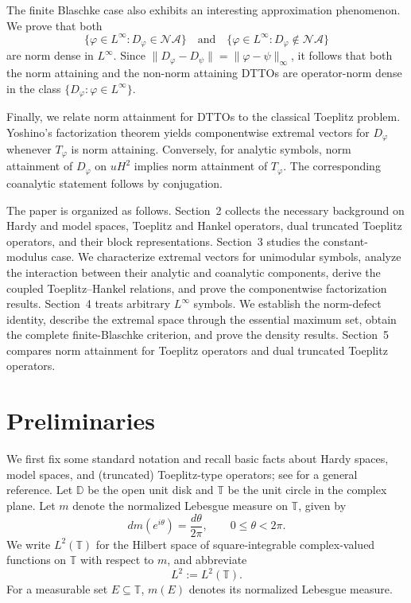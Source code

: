 \documentclass[12pt]{amsart}
\theoremstyle{definition}
\theoremstyle{remark}
\def \D{\mathbb{D}}
\def \T{\mathbb{T}}
\newcommand{\vp}{\varphi}
\numberwithin{equation}{section}
\begin{document}
The finite Blaschke case also exhibits an interesting approximation
phenomenon. We prove that both
\[
\{\vp\in L^\infty:D_\vp\in\mathcal{NA}\}
\quad\text{and}\quad
\{\vp\in L^\infty:D_\vp\notin\mathcal{NA}\}
\]
are norm dense in $L^\infty$. Since
$\|D_\vp-D_\psi\|=\|\vp-\psi\|_\infty$, it follows that both the
norm attaining and the non-norm attaining DTTOs are operator-norm
dense in the class $\{D_\vp:\vp\in L^\infty\}$.

Finally, we relate norm attainment for DTTOs to the classical
Toeplitz problem. Yoshino's factorization theorem yields
componentwise extremal vectors for $D_\vp$ whenever $T_\vp$ is norm
attaining. Conversely, for analytic symbols, norm attainment of
$D_\vp$ on $uH^2$ implies norm attainment of $T_\vp$. The
corresponding coanalytic statement follows by conjugation.

The paper is organized as follows. Section~2 collects the necessary
background on Hardy and model spaces, Toeplitz and Hankel operators,
dual truncated Toeplitz operators, and their block representations.
Section~3 studies the constant-modulus case. We characterize
extremal vectors for unimodular symbols, analyze the interaction
between their analytic and coanalytic components, derive the coupled
Toeplitz--Hankel relations, and prove the componentwise factorization
results. Section~4 treats arbitrary $L^\infty$ symbols. We establish
the norm-defect identity, describe the extremal space through the
essential maximum set, obtain the complete finite-Blaschke criterion,
and prove the density results. Section~5 compares norm attainment for
Toeplitz operators and dual truncated Toeplitz operators.

\section{Preliminaries} 

We first fix some standard notation and recall basic facts about Hardy spaces, model spaces, and (truncated) Toeplitz-type operators; see \cite{Garcia2016} for a general reference. Let $\D$ be the open unit disk and $\T$ be the unit circle in the complex plane. Let $m$ denote the normalized Lebesgue measure on $\T$, given by
\[
dm(e^{i\theta})=\frac{d\theta}{2\pi},
\qquad 0\leq\theta<2\pi.
\]
We write $L^2(\T)$ for the Hilbert space of square-integrable complex-valued functions on $\T$ with respect to $m$, and abbreviate
\[
L^2:=L^2(\T).
\]
For a measurable set $E\subseteq\T$, $m(E)$ denotes its normalized Lebesgue measure.
\end{document}
